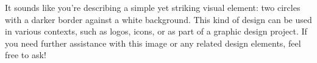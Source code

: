 It sounds like you're describing a simple yet striking visual element: two circles with a darker border against a white background. This kind of design can be used in various contexts, such as logos, icons, or as part of a graphic design project. If you need further assistance with this image or any related design elements, feel free to ask!